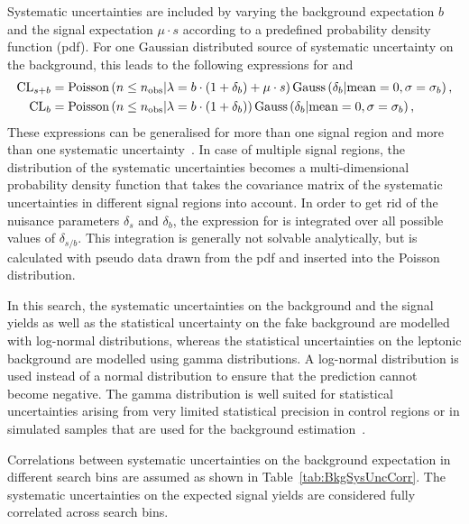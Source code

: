 Systematic uncertainties are included by varying the background expectation $b$ and the signal expectation $\mu\cdot s$ according to a predefined probability density function (pdf).
For one Gaussian distributed source of systematic uncertainty on the background, this leads to the following expressions for \CLsb and \CLb
\begin{equation*}
\begin{split}
\text{CL}_{s+b} &= \text{Poisson}\left( n \leq n_{\text{obs}} |\lambda = b \cdot (1+\delta_b)+\mu\cdot s   \right) \text{Gauss}\left(\delta_b|\text{mean}=0, \sigma = \sigma_b\right),\\
\text{CL}_{b}  &= \text{Poisson}\left( n \leq n_{\text{obs}} |\lambda = b \cdot (1+\delta_b)   \right) \text{Gauss}\left(\delta_b|\text{mean}=0, \sigma = \sigma_b\right),
\end{split}
\end{equation*}
These expressions can be generalised for more than one signal region and more than one systematic uncertainty~\cite{bib:Ott_Thesis}.
In case of multiple signal regions, the distribution of the systematic uncertainties becomes a multi-dimensional probability density function that takes the covariance matrix of the systematic uncertainties in different signal regions into account.
In order to get rid of the nuisance parameters $\delta_s$ and $\delta_b$, the expression for \CLs is integrated over all possible values of $\delta_{s/b}$.
This integration is generally not solvable analytically, but is calculated with pseudo data drawn from the pdf and inserted into the Poisson distribution.

In this search, the systematic uncertainties on the background and the signal yields as well as the statistical uncertainty on the fake background are modelled with log-normal distributions, 
whereas the statistical uncertainties on the leptonic background are modelled using gamma distributions.
A log-normal distribution is used instead of a normal distribution to ensure that the prediction cannot become negative.
The gamma distribution is well suited for statistical uncertainties arising from very limited statistical precision in control regions or in simulated samples that are used for the background estimation~\cite{bib:CMS:Combine}.

Correlations between systematic uncertainties on the background expectation in different search bins are assumed as shown in Table~\ref{tab:BkgSysUncCorr}.
The systematic uncertainties on the expected signal yields are considered fully correlated across search bins.

